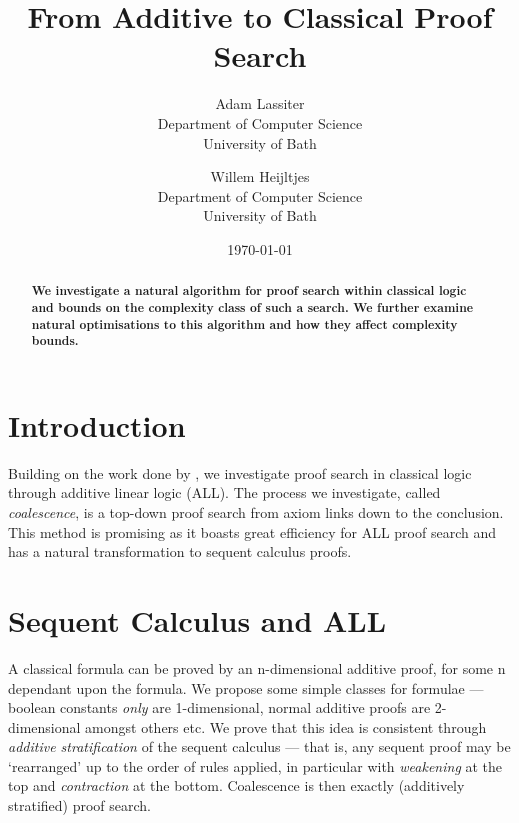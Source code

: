 

\title{From Additive to Classical Proof Search}
\author{Adam Lassiter\\Department of Computer Science\\University of Bath \and Willem Heijltjes\\Department of Computer Science\\University of Bath}
\date{\today}



    \maketitle
    \begin{abstract}
        \textbf{
            We investigate a natural algorithm for proof search within classical logic and bounds on the complexity class of such a search.
            We further examine natural optimisations to this algorithm and how they affect complexity bounds.
        }
    \end{abstract}

    \section*{Introduction}
        Building on the work done by \citet{petri-nets}, we investigate proof search in classical logic through additive linear logic (ALL).
        The process we investigate, called \textit{coalescence}, is a top-down proof search from axiom links down to the conclusion.
        This method is promising as it boasts great efficiency for ALL proof search and has a natural transformation to sequent calculus proofs.

    \section*{Sequent Calculus and ALL}
        A classical formula can be proved by an n-dimensional additive proof, for some n dependant upon the formula.
        We propose some simple classes for formulae --- boolean constants \textit{only} are 1-dimensional, normal additive proofs are 2-dimensional amongst others etc.
        We prove that this idea is consistent through \textit{additive stratification} of the sequent calculus --- that is, any sequent proof may be `rearranged' up to the order of rules applied, in particular with \textit{weakening} at the top and \textit{contraction} at the bottom.
        Coalescence is then exactly (additively stratified) proof search.

